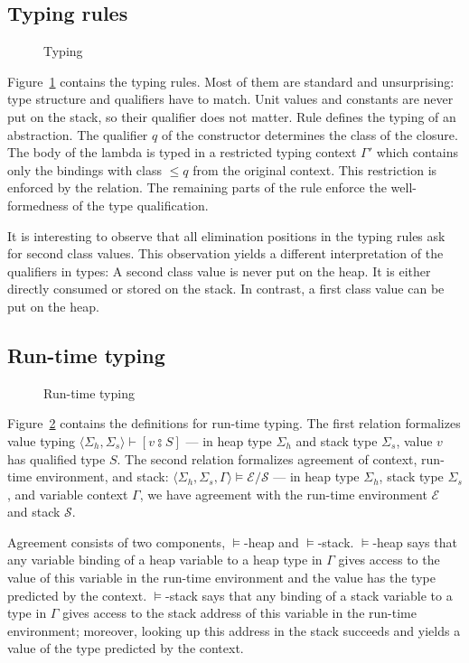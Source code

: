 \documentclass[sigplan,review,dvipsnames,screen,10pt]{acmart}
\begin{document}
\subsection{Typing rules}
\label{sec:typing-rules}
\begin{figure}[tp]
  \TypingRules  
  \caption{Typing}
  \label{fig:typing}
\end{figure}
Figure~\ref{fig:typing} contains the typing rules. Most of them are
standard and unsurprising: type structure and qualifiers have to
match. Unit values and constants are never put on the stack, so their
qualifier does not matter. Rule {\ACTAbs} defines the typing of an
abstraction. The qualifier $q$ of the {\AClam} constructor determines
the class of the closure. The body of the lambda is typed in a
restricted typing context $\Gamma'$ which contains only the
bindings with class $\le q$ from the original context. This
restriction is enforced by the {\AqBounded} relation. The remaining
parts of the rule enforce the well-formedness of the type
qualification.

It is interesting to observe that all elimination positions in the
typing rules ask for second class values. This observation yields a
different interpretation of the qualifiers in types: A second class
value is never put on the heap. It is either directly consumed or
stored on the stack. In contrast, a first class value can be put on
the heap.

\subsection{Run-time typing}
\label{sec:run-time-typing}
\begin{figure}[tp]
  \ValueTyping
  \caption{Run-time typing}
  \label{fig:run-time-typing}
\end{figure}

Figure~\ref{fig:run-time-typing} contains the definitions for run-time
typing. The first relation formalizes value typing $\langle \Sigma_h,
\Sigma_s \rangle\vdash{[ v \typecolon S]}$ --- in heap type $\Sigma_h$
and stack type $\Sigma_s$, value $v$ has qualified type $S$. The
second relation formalizes agreement of context, run-time environment,
and stack: $\langle \Sigma_h , \Sigma_s,
\Gamma\rangle\models\mathcal{E}/\mathcal{S}$ --- in heap type
$\Sigma_h$, stack type $\Sigma_s$, and variable context $\Gamma$, we
have agreement with the run-time environment $\mathcal{E}$ and stack
$\mathcal{S}$.

Agreement consists of two components, $\models$-heap and
$\models$-stack.
$\models$-heap says that any variable binding of a heap variable to a
heap type in $\Gamma$ gives access to the value of this variable in
the run-time environment and the value has the type predicted by the
context.
$\models$-stack says that any binding of a stack variable to a type in
$\Gamma$ gives access to the stack address of this variable in the
run-time environment; moreover, looking up this address in the stack
succeeds and yields a value of the type predicted by the context.
\end{document}
